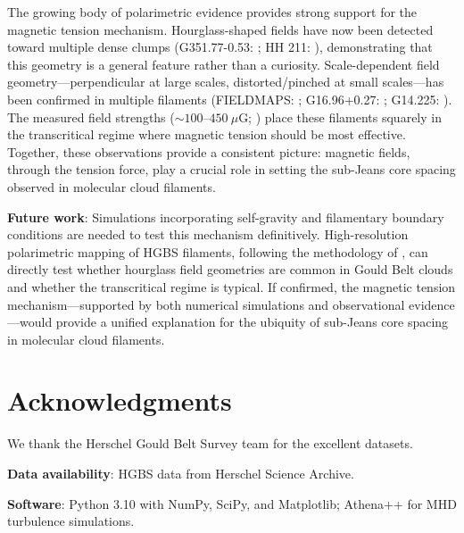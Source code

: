 \documentclass[11pt,a4paper]{article}
\begin{document}
The growing body of polarimetric evidence provides strong support for the magnetic tension mechanism. Hourglass-shaped fields have now been detected toward multiple dense clumps (G351.77-0.53: \citet{Jadhav2026}; HH 211: \citet{Choi2025}), demonstrating that this geometry is a general feature rather than a curiosity. Scale-dependent field geometry—perpendicular at large scales, distorted/pinched at small scales—has been confirmed in multiple filaments (FIELDMAPS: \citet{Coude2025}; G16.96+0.27: \citet{Gu2024}; G14.225: \citet{AnezLopez2026}). The measured field strengths ($\sim100$--$450~\mu$G; \citet{Gu2024, Biswas2026}) place these filaments squarely in the transcritical regime where magnetic tension should be most effective. Together, these observations provide a consistent picture: magnetic fields, through the tension force, play a crucial role in setting the sub-Jeans core spacing observed in molecular cloud filaments.

\textbf{Future work}: Simulations incorporating self-gravity and filamentary boundary conditions are needed to test this mechanism definitively. High-resolution polarimetric mapping of HGBS filaments, following the methodology of \citet{Jadhav2026}, can directly test whether hourglass field geometries are common in Gould Belt clouds and whether the transcritical regime is typical. If confirmed, the magnetic tension mechanism—supported by both numerical simulations and observational evidence—would provide a unified explanation for the ubiquity of sub-Jeans core spacing in molecular cloud filaments.

\section*{Acknowledgments}

We thank the Herschel Gould Belt Survey team for the excellent datasets.

\textbf{Data availability}: HGBS data from Herschel Science Archive.

\textbf{Software}: Python 3.10 with NumPy, SciPy, and Matplotlib; Athena++ \citep{Stone2020} for MHD turbulence simulations.



\end{document}
